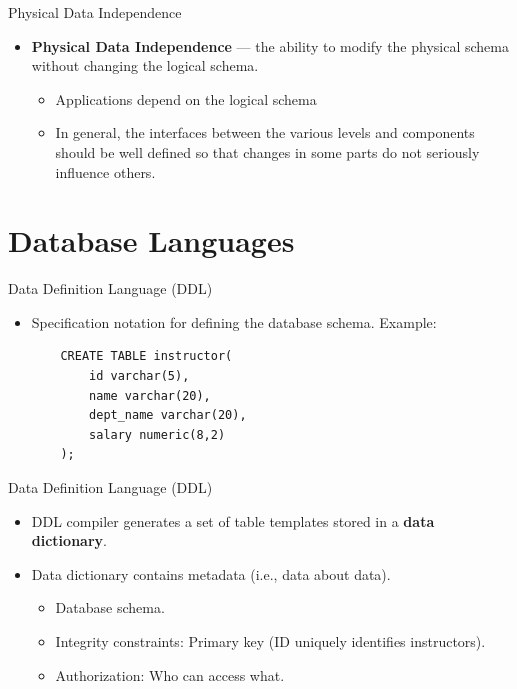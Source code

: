 \documentclass{beamer}
\begin{document}
\begin{frame}{Physical Data Independence}
    \begin{itemize}
        \item \textbf{Physical Data Independence} --- the ability to modify the physical schema without changing the logical schema.
        \begin{itemize}
            \item Applications depend on the logical schema
            \item In general, the interfaces between the various levels and components should be well defined so that changes in some parts do not seriously influence others.
        \end{itemize}
    \end{itemize}
\end{frame}

\section{Database Languages}

\begin{frame}[fragile]{Data Definition Language (DDL)}
    \begin{itemize}
        \item Specification notation for defining the database schema.  Example:
        \begin{verbatim}
    CREATE TABLE instructor(
        id varchar(5),
        name varchar(20),
        dept_name varchar(20),
        salary numeric(8,2)
    );
        \end{verbatim}
    \end{itemize}
\end{frame}

\begin{frame}{Data Definition Language (DDL)}
    \begin{itemize}
        \item DDL compiler generates a set of table templates stored in a \textbf{data dictionary}.
        \item Data dictionary contains metadata (i.e., data about data).
        \begin{itemize}
            \item Database schema.
            \item Integrity constraints: Primary key (ID uniquely identifies instructors).
            \item Authorization: Who can access what.
        \end{itemize}
    \end{itemize}
\end{frame}
\end{document}
